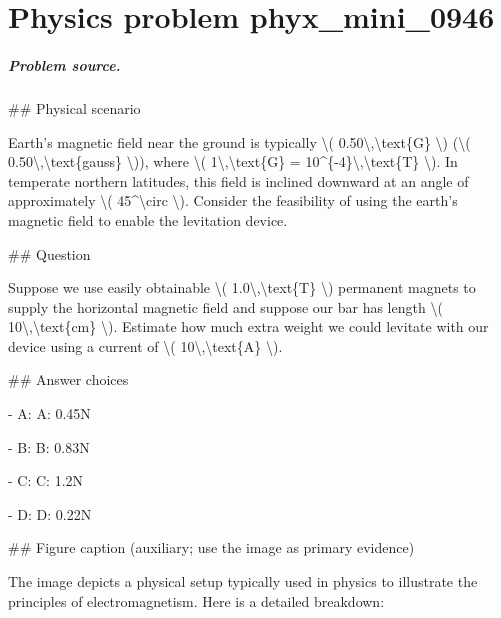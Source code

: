 
\chapter{Physics problem phyx\_mini\_0946}
\label{ch:PhyXMiniProblems_problem_phyx_mini_0946}

\paragraph{Problem source.}
\#\# Physical scenario

Earth's magnetic field near the ground is typically \textbackslash{}( 0.50\textbackslash{},\textbackslash{}text\{G\} \textbackslash{}) (\textbackslash{}( 0.50\textbackslash{},\textbackslash{}text\{gauss\} \textbackslash{})), where \textbackslash{}( 1\textbackslash{},\textbackslash{}text\{G\} = 10\textasciicircum{}\{-4\}\textbackslash{},\textbackslash{}text\{T\} \textbackslash{}). In temperate northern latitudes, this field is inclined downward at an angle of approximately \textbackslash{}( 45\textasciicircum{}\textbackslash{}circ \textbackslash{}). Consider the feasibility of using the earth's magnetic field to enable the levitation device.

\#\# Question

Suppose we use easily obtainable \textbackslash{}( 1.0\textbackslash{},\textbackslash{}text\{T\} \textbackslash{}) permanent magnets to supply the horizontal magnetic field and suppose our bar has length \textbackslash{}( 10\textbackslash{},\textbackslash{}text\{cm\} \textbackslash{}). Estimate how much extra weight we could levitate with our device using a current of \textbackslash{}( 10\textbackslash{},\textbackslash{}text\{A\} \textbackslash{}).

\#\# Answer choices

- A: A: 0.45N

- B: B: 0.83N

- C: C: 1.2N

- D: D: 0.22N

\#\# Figure caption (auxiliary; use the image as primary evidence)

The image depicts a physical setup typically used in physics to illustrate the principles of electromagnetism. Here is a detailed breakdown:

